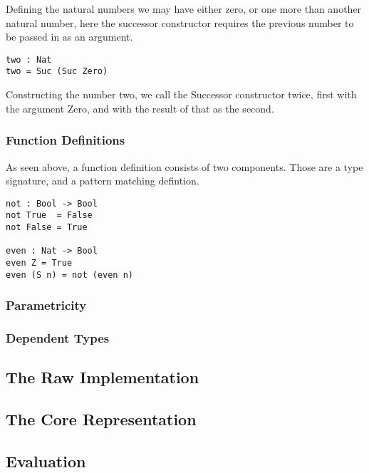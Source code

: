 \documentclass[a4paper]{article}
\begin{document}
Defining the natural numbers we may have either zero, or one more than another natural number, 
here the successor constructor requires the previous number to be passed in as an argument.

\begin{center}
\begin{verbatim}
two : Nat
two = Suc (Suc Zero)
\end{verbatim}
\end{center}

Constructing the number two, we call the Successor constructor twice, first with the argument Zero,
and with the result of that as the second. 

\subsubsection{Function Definitions}
\label{sec:orgb63c8f0}
As seen above, a function definition consists of two components. Those are a type signature,
and a pattern matching defintion.

\begin{center}
\begin{verbatim}
not : Bool -> Bool
not True  = False
not False = True

even : Nat -> Bool
even Z = True
even (S n) = not (even n)
\end{verbatim}
\end{center}



\subsubsection{Parametricity}
\label{sec:org0dc189c}
\subsubsection{Dependent Types}
\label{sec:orgfd68112}
\subsection{The Raw Implementation}
\label{sec:org92fb824}
\subsection{The Core Representation}
\label{sec:org6fc335e}
\subsection{Evaluation}
\label{sec:orgaeb4ccd}
\end{document}
